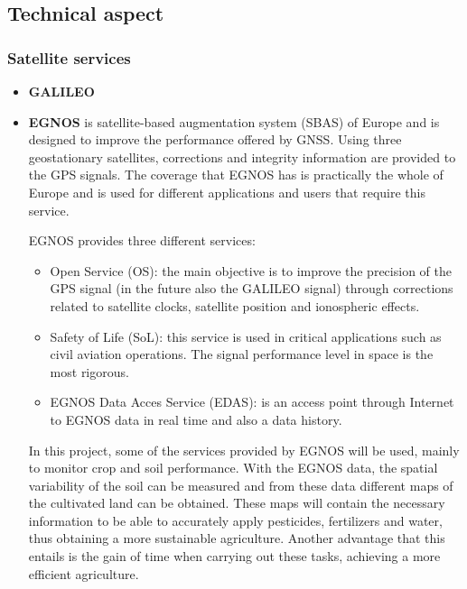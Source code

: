 
\newpage
\subsection{Technical aspect}
\subsubsection{Satellite services}
\begin{itemize}
    \item \textbf{GALILEO}
    \item \textbf{EGNOS} is satellite-based augmentation system (SBAS) of Europe and is designed to improve the performance offered by GNSS. Using three geostationary satellites, corrections and integrity information are provided to the GPS signals. The coverage that EGNOS has is practically the whole of Europe and is used for different applications and users that require this service.
    
    EGNOS provides three different services:
    
    \begin{itemize}
    
		\item Open Service (OS): the main objective is to improve the precision of the GPS signal (in the future also the GALILEO signal) through corrections related to satellite clocks, satellite position and ionospheric effects.
		
		\item Safety of Life (SoL): this service is used in critical applications such as civil aviation operations. The signal performance level in space is the most rigorous.
		
		\item EGNOS Data Acces Service (EDAS): is an access point through Internet to EGNOS data in real time and also a data history.
		
	\end{itemize}

    In this project, some of the services provided by EGNOS will be used, mainly to monitor crop and soil performance. With the EGNOS data, the spatial variability of the soil can be measured and from these data different maps of the cultivated land can be obtained. These maps will contain the necessary information to be able to accurately apply pesticides, fertilizers and water, thus obtaining a more sustainable agriculture. Another advantage that this entails is the gain of time when carrying out these tasks, achieving a more efficient agriculture.


\end{itemize}

